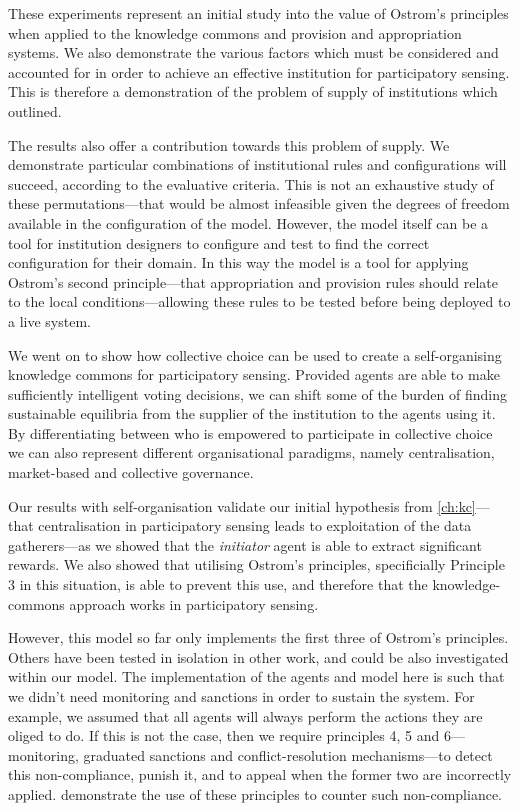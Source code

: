 These experiments represent an initial study into the value of Ostrom's
principles when applied to the knowledge commons and provision and
appropriation systems. We also demonstrate the various factors which must be
considered and accounted for in order to achieve an effective institution for
participatory sensing. This is therefore a demonstration of the problem of
supply of institutions which \citet{Ostrom1990} outlined.

The results also offer a contribution towards this problem of supply. We
demonstrate particular combinations of institutional rules and configurations
will succeed, according to the evaluative criteria. This is not an exhaustive
study of these permutations---that would be almost infeasible given the degrees of
freedom available in the configuration of the model. However, the model itself
can be a tool for institution designers to configure and test to find the
correct configuration for their domain. In this way the model is a tool for
applying Ostrom's second principle---that appropriation and provision rules
should relate to the local conditions---allowing these rules to be tested
before being deployed to a live system.

We went on to show how collective choice can be used to create a 
self-organising knowledge commons for participatory sensing. Provided agents are
able to make sufficiently intelligent voting decisions, we can shift some of
the burden of finding sustainable equilibria from the supplier of the
institution to the agents using it. By differentiating between who is
empowered to participate in collective choice we can also represent different
organisational paradigms, namely centralisation, market-based and collective
governance.

Our results with self-organisation validate our initial hypothesis from
\autoref{ch:kc}---that centralisation in participatory sensing leads to
exploitation of the data gatherers---as we showed that the \emph{initiator}
agent is able to extract significant rewards. We also showed that utilising
Ostrom's principles, specificially Principle 3 in this situation, is able to
prevent this use, and therefore that the knowledge-commons approach works in
participatory sensing.

However, this model so far only implements the first three of Ostrom's
principles. Others have been tested in isolation in other work, and
could be also investigated within our model. The implementation of the agents
and model here is such that we didn't need monitoring and sanctions in order
to sustain the system. For example, we assumed that all agents will always
perform the actions they are oliged to do. If this is not the case, then we
require principles 4, 5 and 6---monitoring, graduated sanctions and 
conflict-resolution mechanisms---to detect this non-compliance, punish it, and to
appeal when the former two are incorrectly applied. \citet{Pitt2012b}
demonstrate the use of these principles to counter such non-compliance.


